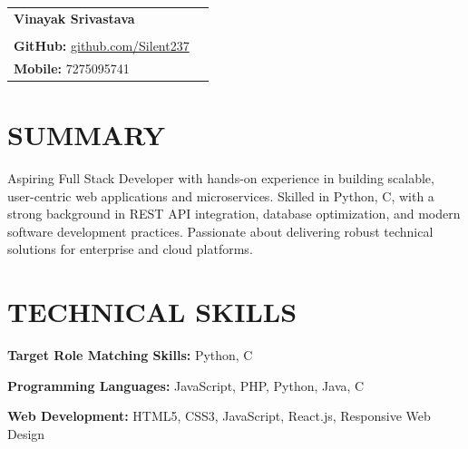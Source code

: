 \documentclass[a4paper,10.9pt]{article}
\begin{document}

\begin{tabularx}{\textwidth}{@{}X r@{}}
{\fontsize{22}{24}\selectfont\bfseries\color{hdrblue}Vinayak Srivastava} & \\[-1pt]
\vspace{1}

\begin{tabular}[t]{@{}l@{}}
{\small\textbf{LinkedIn:}
\href{https://www.linkedin.com/in/vinayak-srivastava-silent}
{linkedin.com/in/vinayak-srivastava-silent}}\\[-2pt]

{\small\textbf{GitHub:}
\href{https://github.com/Silent237}{github.com/Silent237}}
\end{tabular}

&

\begin{tabular}[t]{@{}r@{}}
{\small\textbf{Email:}
\href{mailto:vinayaksrivastava063@gmail.com}{vinayaksrivastava063@gmail.com}}\\[-2pt]

{\small\textbf{Mobile:} 7275095741}
\end{tabular}

\end{tabularx}

\vspace{-6pt}


\section*{SUMMARY}

Aspiring Full Stack Developer with hands-on experience in building scalable, user-centric web applications and microservices. Skilled in Python, C, with a strong background in REST API integration, database optimization, and modern software development practices. Passionate about delivering robust technical solutions for enterprise and cloud platforms.

\section*{TECHNICAL SKILLS}

\textbf{Target Role Matching Skills:} Python, C

\textbf{Programming Languages:} JavaScript, PHP, Python, Java, C

\textbf{Web Development:} HTML5, CSS3, JavaScript, React.js, Responsive Web Design
\end{document}
